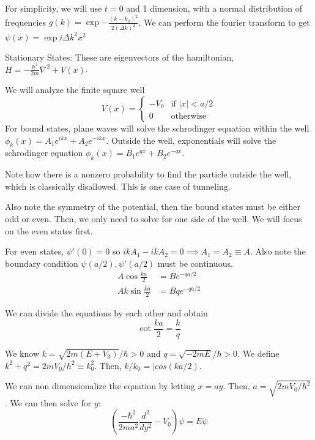 \documentclass[12pt]{article}
\begin{document}
For simplicity, we will use $t=0$ and 1 dimension, with a normal distribution of frequencies $g(k)=\exp{-\frac{(k-k_0)^2}{2(\Delta k)^2}}$. We can perform the fourier transform to get $\psi(x)=\exp{i\Delta k^2 x^2}$

Stationary States: 
These are eigenvectors of the hamiltonian, $H=-\frac{\hbar^2}{2m}\nabla^2+V(x)$.

We will analyze the finite square well
\begin{equation}
    V(x) = \begin{cases}
        -V_0 & \text{if } |x|<a/2\\
        0 & \text{otherwise}
    \end{cases}
\end{equation}
For bound states, plane waves will solve the schrodinger equation within the well $\phi_k(x)=A_1e^{ikx}+A_2e^{-ikx}$. Outside the well, exponentials will solve the schrodinger equation $\phi_k(x)=B_1e^{qx}+B_2e^{-qx}$. 

Note how there is a nonzero probability to find the particle outside the well, which is classically disallowed. This is one case of tunneling.

Also note the symmetry of the potential, then the bound states must be either odd or even. Then, we only need to solve for one side of the well. We will focus on the even states first.

For even states, $\psi'(0)=0$ so $ikA_1-ikA_2=0\implies A_1=A_2\equiv A$. Also note the boundary condition $\psi(a/2), \psi'(a/2)$ must be continuous. 
\begin{align}
    A\cos\frac{ka}{2}&=Be^{-qa/2}\\
    Ak\sin\frac{ka}{2}&=Bqe^{-qa/2}
\end{align}

We can divide the equations by each other and obtain
\begin{equation}
    \cot\frac{ka}{2}=\frac{k}{q}
\end{equation}

We know $k=\sqrt{2m(E+V_0)}/\hbar>0$ and $q=\sqrt{-2mE}/\hbar>0$. We define $k^2+q^2=2mV_0/\hbar^2\equiv k_0^2$. Then, $k/k_0=|cos(ka/2)$.

We can non dimensionalize the equation by letting $x=ay$. Then, $a=\sqrt{2mV_0/\hbar^2}$. We can then solve for $y$:
\begin{equation}
    \left(\frac{-\hbar^2}{2ma^2}\frac{d^2}{dy^2}-V_0\right) \psi = E\psi
\end{equation}
\end{document}
